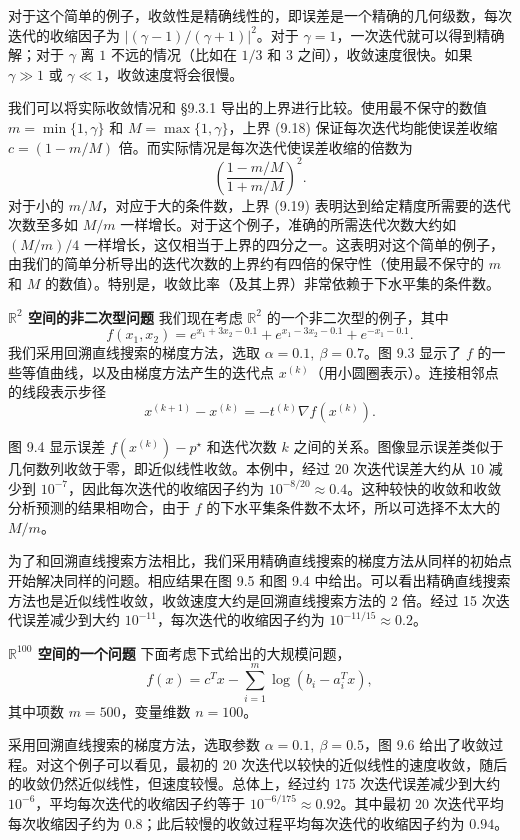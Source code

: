 \documentclass[UTF8,12pt,a4paper,fontset=fandol]{ctexart}
\begin{document}
对于这个简单的例子，收敛性是精确线性的，即误差是一个精确的几何级数，每次迭代的收缩因子为 $|(\gamma-1)/(\gamma+1)|^2$。对于 $\gamma=1$，一次迭代就可以得到精确解；对于 $\gamma$ 离 $1$ 不远的情况（比如在 $1/3$ 和 $3$ 之间），收敛速度很快。如果 $\gamma\gg1$ 或 $\gamma\ll1$，收敛速度将会很慢。

我们可以将实际收敛情况和 \S9.3.1 导出的上界进行比较。使用最不保守的数值 $m=\min\{1,\gamma\}$ 和 $M=\max\{1,\gamma\}$，上界 (9.18) 保证每次迭代均能使误差收缩 $c=(1-m/M)$ 倍。而实际情况是每次迭代使误差收缩的倍数为
\[
\left(\frac{1-m/M}{1+m/M}\right)^2.
\]
对于小的 $m/M$，对应于大的条件数，上界 (9.19) 表明达到给定精度所需要的迭代次数至多如 $M/m$ 一样增长。对于这个例子，准确的所需迭代次数大约如 $(M/m)/4$ 一样增长，这仅相当于上界的四分之一。这表明对这个简单的例子，由我们的简单分析导出的迭代次数的上界约有四倍的保守性（使用最不保守的 $m$ 和 $M$ 的数值）。特别是，收敛比率（及其上界）非常依赖于下水平集的条件数。

\noindent\textbf{$\mathbb{R}^2$ 空间的非二次型问题}\quad
我们现在考虑 $\mathbb{R}^2$ 的一个非二次型的例子，其中
\begin{equation}
f(x_1,x_2)=e^{x_1+3x_2-0.1}+e^{x_1-3x_2-0.1}+e^{-x_1-0.1}.
\tag{9.20}
\end{equation}
我们采用回溯直线搜索的梯度方法，选取 $\alpha=0.1,\ \beta=0.7$。图 9.3 显示了 $f$ 的一些等值曲线，以及由梯度方法产生的迭代点 $x^{(k)}$（用小圆圈表示）。连接相邻点的线段表示步径
\[
x^{(k+1)}-x^{(k)}=-t^{(k)}\nabla f(x^{(k)}).
\]

图 9.4 显示误差 $f(x^{(k)})-p^\star$ 和迭代次数 $k$ 之间的关系。图像显示误差类似于几何数列收敛于零，即近似线性收敛。本例中，经过 20 次迭代误差大约从 $10$ 减少到 $10^{-7}$，因此每次迭代的收缩因子约为 $10^{-8/20}\approx0.4$。这种较快的收敛和收敛分析预测的结果相吻合，由于 $f$ 的下水平集条件数不太坏，所以可选择不太大的 $M/m$。

为了和回溯直线搜索方法相比，我们采用精确直线搜索的梯度方法从同样的初始点开始解决同样的问题。相应结果在图 9.5 和图 9.4 中给出。可以看出精确直线搜索方法也是近似线性收敛，收敛速度大约是回溯直线搜索方法的 2 倍。经过 15 次迭代误差减少到大约 $10^{-11}$，每次迭代的收缩因子约为 $10^{-11/15}\approx0.2$。

\noindent\textbf{$\mathbb{R}^{100}$ 空间的一个问题}\quad
下面考虑下式给出的大规模问题，
\begin{equation}
f(x)=c^Tx-\sum_{i=1}^m\log(b_i-a_i^Tx),
\tag{9.21}
\end{equation}
其中项数 $m=500$，变量维数 $n=100$。

采用回溯直线搜索的梯度方法，选取参数 $\alpha=0.1,\ \beta=0.5$，图 9.6 给出了收敛过程。对这个例子可以看见，最初的 20 次迭代以较快的近似线性的速度收敛，随后的收敛仍然近似线性，但速度较慢。总体上，经过约 175 次迭代误差减少到大约 $10^{-6}$，平均每次迭代的收缩因子约等于 $10^{-6/175}\approx0.92$。其中最初 20 次迭代平均每次收缩因子约为 $0.8$；此后较慢的收敛过程平均每次迭代的收缩因子约为 $0.94$。
\end{document}
